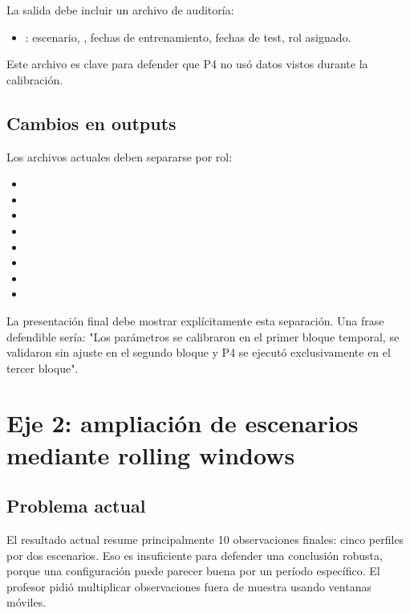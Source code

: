 \documentclass[11pt]{article}
\begin{document}
La salida debe incluir un archivo de auditor\'ia:

\begin{itemize}
    \item {}: escenario, , fechas de entrenamiento, fechas de test, rol asignado.
\end{itemize}

Este archivo es clave para defender que P4 no us\'o datos vistos durante la calibraci\'on.

\subsection{Cambios en outputs}

Los archivos actuales deben separarse por rol:

\begin{itemize}
    \item {}
    \item {}
    \item {}
    \item {}
    \item {}
    \item {}
    \item {}
    \item {}
\end{itemize}

La presentación final debe mostrar explícitamente esta separación. Una frase defendible sería: "Los parámetros se calibraron en el primer bloque temporal, se validaron sin ajuste en el segundo bloque y P4 se ejecutó exclusivamente en el tercer bloque".

\section{Eje 2: ampliaci\'on de escenarios mediante rolling windows}

\subsection{Problema actual}

El resultado actual resume principalmente 10 observaciones finales: cinco perfiles por dos escenarios. Eso es insuficiente para defender una conclusi\'on robusta, porque una configuraci\'on puede parecer buena por un per\'iodo espec\'ifico. El profesor pidi\'o multiplicar observaciones fuera de muestra usando ventanas m\'oviles.
\end{document}
